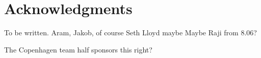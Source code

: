 

\chapter*{Acknowledgments}


To be written.
Aram, Jakob, of course
Seth Lloyd maybe
Maybe Raji from 8.06?

The Copenhagen team half sponsors this right?
